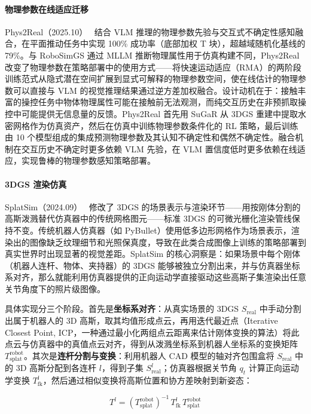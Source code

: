 \paragraph{物理参数在线适应迁移}

Phys2Real（2025.10）~\cite{2510_11689} 结合 VLM 推理的物理参数先验与交互式不确定性感知融合，在平面推动任务中实现 100\% 成功率（底部加权 T 块），超越域随机化基线的 79\%。与 RoboSimGS 通过 MLLM 推断物理属性用于仿真构建不同，Phys2Real 改变了物理参数在策略部署中的使用方式——将快速运动适应（RMA）的两阶段训练范式从隐式潜在空间扩展到显式可解释的物理参数空间，使在线估计的物理参数可以直接与 VLM 的视觉推理结果通过逆方差加权融合。设计动机在于：接触丰富的操控任务中物体物理属性可能在接触前无法观测，而纯交互历史在非预抓取操控中可能提供无信息量的反馈。Phys2Real 首先用 SuGaR 从 3DGS 重建中提取水密网格作为仿真资产，然后在仿真中训练物理参数条件化的 RL 策略，最后训练由 10 个模型组成的集成预测物理参数及其认知不确定性和偶然不确定性。融合机制在交互历史不确定时更多依赖 VLM 先验，在 VLM 置信度低时更多依赖在线适应，实现鲁棒的物理参数感知策略部署。

\paragraph{3DGS 渲染仿真}

SplatSim（2024.09）~\cite{2409_10161} 修改了 3DGS 的场景表示与渲染环节——用按刚体分割的高斯泼溅替代仿真器中的传统网格图元——标准 3DGS 的可微光栅化渲染管线保持不变。传统机器人仿真器（如 PyBullet）使用低多边形网格作为场景表示，渲染出的图像缺乏纹理细节和光照保真度，导致在此类合成图像上训练的策略部署到真实世界时出现显著的视觉差距。SplatSim 的核心洞察是：如果场景中每个刚体（机器人连杆、物体、夹持器）的 3DGS 能够被独立分割出来，并与仿真器坐标系对齐，那么就能利用仿真器提供的正向运动学直接驱动这些高斯子集渲染出任意关节角度下的照片级图像。

具体实现分三个阶段。首先是\textbf{坐标系对齐}：从真实场景的 3DGS $S_\text{real}$ 中手动分割出属于机器人的 3D 高斯，取其均值形成点云，再用迭代最近点（Iterative Closest Point, ICP，一种通过最小化两组点云距离来估计刚体变换的算法）将此点云与仿真器中的真值点云对齐，得到从泼溅坐标系到机器人坐标系的变换矩阵 $T_\text{splat}^\text{robot}$。其次是\textbf{连杆分割与变换}：利用机器人 CAD 模型的轴对齐包围盒将 $S_\text{real}$ 中的 3D 高斯分配到各连杆 $l$，得到子集 $S_\text{real}^l$；仿真器根据关节角 $q_t$ 计算正向运动学变换 $T_\text{fk}^l$，然后通过相似变换将高斯位置和协方差映射到新姿态：

\begin{equation}
    T^l = (T_\text{splat}^\text{robot})^{-1}\, T_\text{fk}^l\, T_\text{splat}^\text{robot}
\end{equation}

